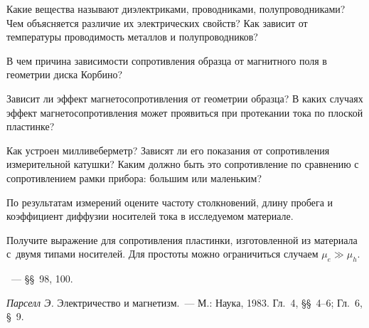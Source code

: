 \begin{lab:questions}

\item Какие вещества называют диэлектриками, проводниками, полупроводниками?
Чем объясняется различие их электрических свойств? Как зависит от температуры
проводимость металлов и полупроводников?

\item В чем причина зависимости сопротивления образца от магнитного
поля в геометрии диска Корбино?

\item Зависит ли эффект магнетосопротивления от геометрии образца? 
В каких случаях эффект магнетосопротивления может проявиться
при протекании тока по плоской пластинке?

\item Как устроен милливеберметр? Зависят ли его показания от сопротивления
измерительной катушки? Каким должно быть это сопротивление по сравнению с
сопротивлением рамки прибора: большим или маленьким?

\item По результатам измерений оцените частоту столкновений,
длину пробега и коэффициент диффузии носителей тока в исследуемом материале.

\item Получите выражение для сопротивления пластинки, изготовленной
из материала с~двумя типами носителей. 
Для простоты можно ограничиться случаем $\mu_e \gg \mu_h$.

\end{lab:questions}


\begin{lab:literature}
\item \SivuhinIII~--- \S\S~98, 100.
\item \textit{Парселл Э.} Электричество и магнетизм.~--- М.: Наука, 1983. Гл.~4,
\S\S~4--6; Гл.~6, \S~9.
\end{lab:literature}

